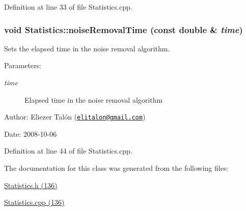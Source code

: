 Definition at line 33 of file Statistics.cpp.\hypertarget{class_statistics_4ad24aec4e5491b7d3afca143e6deb05}{
\subsubsection[noiseRemovalTime]{\setlength{\rightskip}{0pt plus 5cm}void Statistics::noiseRemovalTime (const double \& {\em time})}}
\label{class_statistics_4ad24aec4e5491b7d3afca143e6deb05}


Sets the elapsed time in the noise removal algorithm. 

\begin{Desc}
\item[Parameters:]
\begin{description}
\item[{\em time}]Elapsed time in the noise removal algorithm\end{description}
\end{Desc}
\begin{Desc}
\item[Author:]Eliezer Talón (\href{mailto:elitalon@gmail.com}{\tt elitalon@gmail.com}) \end{Desc}
\begin{Desc}
\item[Date:]2008-10-06 \end{Desc}


Definition at line 44 of file Statistics.cpp.

The documentation for this class was generated from the following files:\begin{CompactItemize}
\item 
\hyperlink{_statistics_8h}{Statistics.h (136)}\item 
\hyperlink{_statistics_8cpp}{Statistics.cpp (136)}\end{CompactItemize}
